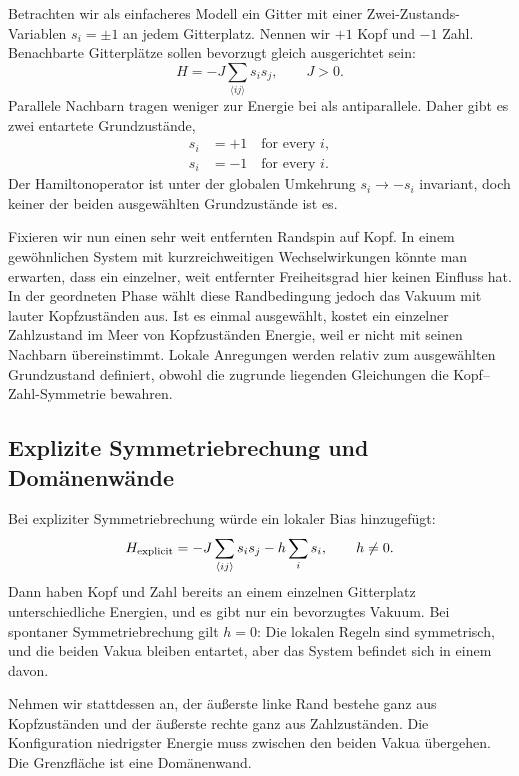 Betrachten wir als einfacheres Modell ein Gitter mit einer Zwei-Zustands-Variablen \(s_i=\pm1\) an jedem Gitterplatz. Nennen wir \(+1\) Kopf und \(-1\) Zahl. Benachbarte Gitterplätze sollen bevorzugt gleich ausgerichtet sein:
\begin{equation}
  H=-J\sum_{\langle ij\rangle}s_i s_j,
  \qquad J>0.
\end{equation}
Parallele Nachbarn tragen weniger zur Energie bei als antiparallele. Daher gibt es zwei entartete Grundzustände,
\begin{equation}
\begin{aligned}
  s_i&=+1\quad\text{for every }i,
  \\
  s_i&=-1\quad\text{for every }i.
\end{aligned}
\end{equation}
Der Hamiltonoperator ist unter der globalen Umkehrung \(s_i\to-s_i\) invariant, doch keiner der beiden ausgewählten Grundzustände ist es.

Fixieren wir nun einen sehr weit entfernten Randspin auf Kopf. In einem gewöhnlichen System mit kurzreichweitigen Wechselwirkungen könnte man erwarten, dass ein einzelner, weit entfernter Freiheitsgrad hier keinen Einfluss hat. In der geordneten Phase wählt diese Randbedingung jedoch das Vakuum mit lauter Kopfzuständen aus. Ist es einmal ausgewählt, kostet ein einzelner Zahlzustand im Meer von Kopfzuständen Energie, weil er nicht mit seinen Nachbarn übereinstimmt. Lokale Anregungen werden relativ zum ausgewählten Grundzustand definiert, obwohl die zugrunde liegenden Gleichungen die Kopf--Zahl-Symmetrie bewahren.

\subsection{Explizite Symmetriebrechung und Domänenwände}

Bei expliziter Symmetriebrechung würde ein lokaler Bias hinzugefügt:
\begin{equation}
  H_{\rm explicit}
  =-J\sum_{\langle ij\rangle}s_i s_j-h\sum_i s_i,
  \qquad h\ne0.
\end{equation}
Dann haben Kopf und Zahl bereits an einem einzelnen Gitterplatz unterschiedliche Energien, und es gibt nur ein bevorzugtes Vakuum. Bei spontaner Symmetriebrechung gilt \(h=0\): Die lokalen Regeln sind symmetrisch, und die beiden Vakua bleiben entartet, aber das System befindet sich in einem davon.

Nehmen wir stattdessen an, der äußerste linke Rand bestehe ganz aus Kopfzuständen und der äußerste rechte ganz aus Zahlzuständen. Die Konfiguration niedrigster Energie muss zwischen den beiden Vakua übergehen. Die Grenzfläche ist eine Domänenwand.

